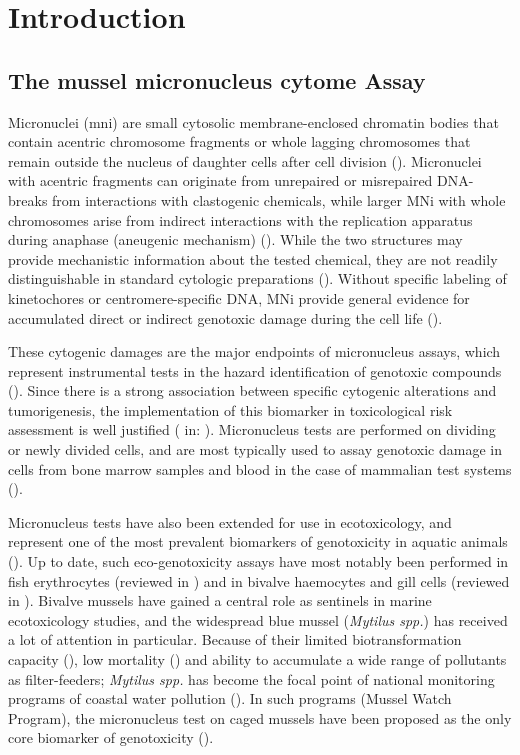 \chapter{Introduction}
\section{The mussel micronucleus cytome Assay}
Micronuclei (\acrshort{mni}) are small cytosolic membrane-enclosed chromatin bodies that contain acentric chromosome fragments or whole lagging chromosomes that remain outside the nucleus of daughter cells after cell division (\cite{Fenech2011}). Micronuclei with acentric fragments can originate from unrepaired or misrepaired DNA-breaks from interactions with clastogenic chemicals, while larger MNi with whole chromosomes arise from indirect interactions with the replication apparatus during anaphase (aneugenic mechanism) (\cite{Fenech2011}). While the two structures may provide mechanistic information about the tested chemical, they are not readily distinguishable in standard cytologic preparations (\cite{Natarajan1993}). Without specific labeling of kinetochores or centromere-specific DNA, MNi provide general evidence for accumulated direct or indirect genotoxic damage during the cell life (\cite{Tucker1996, Lynch1993}).

These cytogenic damages are the major endpoints of micronucleus assays, which represent instrumental tests in the hazard identification of genotoxic compounds (\cite{OECD474, OECD487, USEPA1998}). Since there is a strong association between specific cytogenic alterations and tumorigenesis, the implementation of this biomarker in toxicological risk assessment is well justified (\cite{Mitelman1983} in: \cite{Tucker1996}). Micronucleus tests are performed on dividing or newly divided cells, and are most typically used to assay genotoxic damage in cells from bone marrow samples and blood in the case of mammalian test systems (\cite{Heddle1983, Warheit2018b}).

Micronucleus tests have also been extended for use in ecotoxicology, and represent one of the most prevalent biomarkers of genotoxicity in aquatic animals (\cite{Bolognesi2011}). Up to date, such eco-genotoxicity assays have most notably been performed in fish erythrocytes (reviewed in \cite{Agostini2021}) and in bivalve haemocytes and gill cells (reviewed in \cite{Bolognesi2014}). Bivalve mussels have gained a central role as sentinels in marine ecotoxicology studies, and the widespread blue mussel (\emph{Mytilus spp.}) has received a lot of attention in particular. Because of their limited biotransformation capacity (\cite{Beyer2017b}), low mortality (\cite{Ale2019, Costa2009}) and ability to accumulate a wide range of pollutants as filter-feeders; \emph{Mytilus spp.} has become the focal point of national monitoring programs of coastal water pollution (\cite{Goldberg1975, Beyer2017b, Cajarville2000}). In such programs (Mussel Watch Program), the micronucleus test on caged mussels have been proposed as the only core biomarker of genotoxicity (\cite{Bolognesi2012}).

